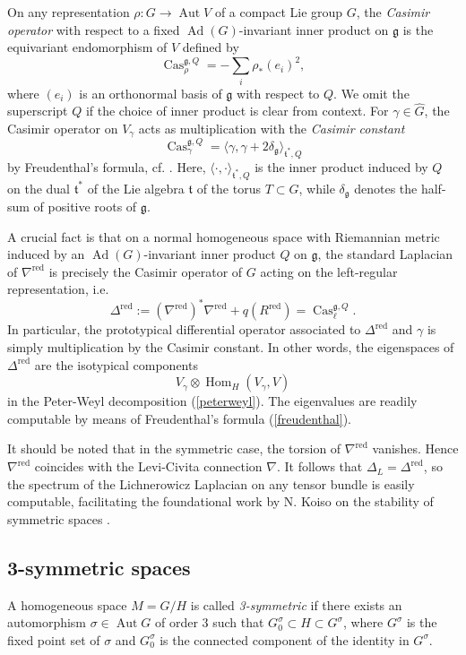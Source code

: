 \documentclass[12pt]{scrartcl}
\theoremstyle{plain}
\theoremstyle{definition}
\newcommand{\Aut}{\operatorname{Aut}}%
\newcommand{\Hom}{\operatorname{Hom}}%
\newcommand{\Ad}{\operatorname{Ad}}%
\newcommand{\Cas}{\operatorname{Cas}}%
\newcommand{\g}{\mathfrak{g}}%
\renewcommand{\t}{\mathfrak{t}}%
\newcommand{\CR}{\nabla^{\mathrm{red}}}%
\newcommand{\Rcr}{R^{\mathrm{red}}}%
\newcommand{\Lcr}{\Delta^{\mathrm{red}}}%
\begin{document}
On any representation $\rho: G\to\Aut V$ of a compact Lie group $G$, the \emph{Casimir operator} with respect to a fixed $\Ad(G)$-invariant inner product on $\g$ is the equivariant endomorphism of $V$ defined by
\[\Cas^{\g,Q}_\rho=-\sum_i\rho_\ast(e_i)^2,\]
where $(e_i)$ is an orthonormal basis of $\g$ with respect to $Q$. We omit the superscript $Q$ if the choice of inner product is clear from context. For $\gamma\in\hat G$, the Casimir operator on $V_\gamma$ acts as multiplication with the \emph{Casimir constant}
\begin{equation}
\Cas^{\g,Q}_\gamma=\langle\gamma,\gamma+2\delta_\g\rangle_{\t^\ast,Q}\label{freudenthal}%
\end{equation}
by Freudenthal's formula, cf. \cite{FH}. Here, $\langle\cdot,\cdot\rangle_{\t^\ast,Q}$ is the inner product induced by $Q$ on the dual $\t^\ast$ of the Lie algebra $\t$ of the torus $T\subset G$, while $\delta_\g$ denotes the half-sum of positive roots of $\g$.

A crucial fact \cite[Lem.~5.2]{hermitianlaplace} is that on a normal homogeneous space with Riemannian metric induced by an $\Ad(G)$-invariant inner product $Q$ on $\g$, the standard Laplacian of $\CR$ is precisely the Casimir operator of $G$ acting on the left-regular representation, i.e.
\begin{equation}
\Lcr:=(\CR)^\ast\CR+q(\Rcr)=\Cas^{\g,Q}_\ell.\label{laplcas}%
\end{equation}
In particular, the prototypical differential operator associated to $\Lcr$ and $\gamma$ is simply multiplication by the Casimir constant. In other words, the eigenspaces of $\Lcr$ are the isotypical components 
\[V_\gamma\otimes\Hom_H(V_\gamma,V)\]
in the Peter-Weyl decomposition (\ref{peterweyl}). The eigenvalues are readily computable by means of Freudenthal's formula (\ref{freudenthal}).

It should be noted that in the symmetric case, the torsion of $\CR$ vanishes. Hence $\CR$ coincides with the Levi-Civita connection $\nabla$. It follows that $\Delta_L=\Lcr$, so the spectrum of the Lichnerowicz Laplacian on any tensor bundle is easily computable, facilitating the foundational work by N. Koiso on the stability of symmetric spaces \cite{koiso}.

\subsection{3-symmetric spaces}
\label{sec:prelim3s}

A homogeneous space $M=G/H$ is called \emph{3-symmetric} if there exists an automorphism $\sigma\in\Aut G$ of order $3$ such that $G_0^\sigma\subset H\subset G^\sigma$, where $G^\sigma$ is the fixed point set of $\sigma$ and $G^\sigma_0$ is the connected component of the identity in $G^\sigma$.
\end{document}
